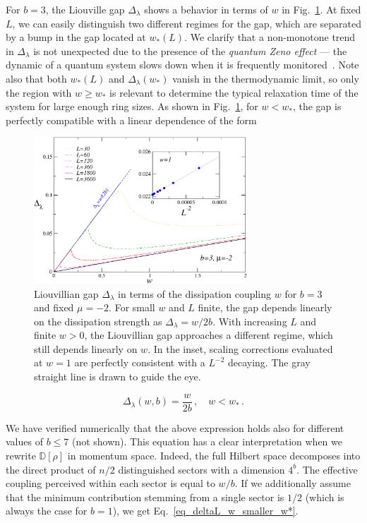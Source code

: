 For $b=3$, the Liouville gap $\Delta_\lambda$ shows a behavior in terms of $w$ in Fig.~\ref{fig_liouvgap3b}.
At fixed $L$, we can easily distinguish two different regimes for the gap, which are separated by a bump in the gap located at $w_*(L)$. We clarify that a non-monotone trend in $\Delta_\lambda$ is not unexpected due to the presence of the \textit{quantum Zeno effect} — the dynamic of a quantum system slows down when it is frequently monitored~\cite{MS-1977-quantumzeno, HHNU-2022-Incoherentons}. Note also that both $w_*(L)$ and $\Delta_\lambda(w_*)$ vanish in the thermodynamic limit, so only the region with $w\geq w_*$ is relevant to determine the typical relaxation time of the system for large enough ring sizes. As shown in Fig.~\ref{fig_liouvgap3b}, for $w<w_*$, the gap is perfectly compatible with a linear dependence of the form

\begin{figure}[!h]
    \centering
    \includegraphics[width=8cm]{imm/gapliouv3b.pdf}
    \caption{Liouvillian gap $\Delta_\lambda$ in terms of the dissipation coupling $w$ for $b=3$ and fixed $\mu=-2$. For small $w$ and $L$ finite, the gap depends linearly on the dissipation strength as $\Delta_\lambda=w/2b$. With increasing $L$ and finite $w>0$, the Liouvillian gap approaches a different regime, which still depends linearly on $w$. In the inset, scaling corrections evaluated at $w=1$ are perfectly consistent with a $L^{-2}$ decaying. The gray straight line is drawn to guide the eye.}
    \label{fig_liouvgap3b}
\end{figure}

\begin{equation}
\Delta_\lambda(w, b)=\frac{w}{2b}\,, \quad w<w_*\,.
\label{eq_deltaL_w_smaller_w*}
\end{equation}

We have verified numerically that the above expression holds also for different values of $b\leq7$ (not shown). This equation has a clear interpretation when we rewrite $\mathbb{D}[\rho]$ in momentum space. Indeed, the full Hilbert space decomposes into the direct product of $n/2$ distinguished sectors with a dimension $4^b$. The effective coupling perceived within each sector is equal to $w/b$. If we additionally assume that the minimum contribution stemming from a single sector is $1/2$ (which is always the case for $b=1$), we get Eq.~\eqref{eq_deltaL_w_smaller_w*}.\\

